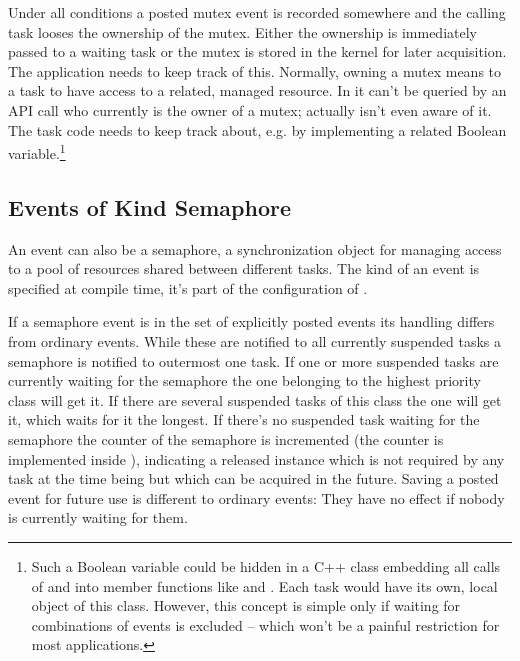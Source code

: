 Under all conditions a posted mutex event is recorded somewhere and the
calling task looses the ownership of the mutex. Either the ownership is
immediately passed to a waiting task or the mutex is stored in the kernel
for later acquisition. The application needs to keep track of this.
Normally, owning a mutex means to a task to have access to a related,
managed resource. In \rtos{} it can't be queried by an API call who
currently is the owner of a mutex; actually \rtos{} isn't even aware of
it. The task code needs to keep track about, e.g. by implementing a
related Boolean variable.\footnote{Such a Boolean variable could be hidden
in a C++ class embedding all calls of  and
 into member functions like  and
. Each task would have its own, local object of this
class. However, this concept is simple only if waiting for combinations of
events is excluded -- which won't be a painful restriction for most
applications.}


\subsection{Events of Kind Semaphore}
\label{secExplicitlyPostEventSemaphore}

An event can also be a semaphore, a synchronization object for managing access
to a pool of resources shared between different tasks. The kind of an
event is specified at compile time, it's part of the configuration of
\rtos.

If a semaphore event is in the set of explicitly posted events its
handling differs from ordinary events. While these are notified to all
currently suspended tasks a semaphore is notified to outermost one task.
If one or more suspended tasks are currently waiting for the semaphore the
one belonging to the highest priority class will get it. If there are
several suspended tasks of this class the one will get it, which waits for
it the longest. If there's no suspended task waiting for the semaphore the
counter of the semaphore is incremented (the counter is implemented inside
\rtos), indicating a released instance which is not required by any task
at the time being but which can be acquired in the future. Saving a posted
event for future use is different to ordinary events: They have no effect
if nobody is currently waiting for them.

